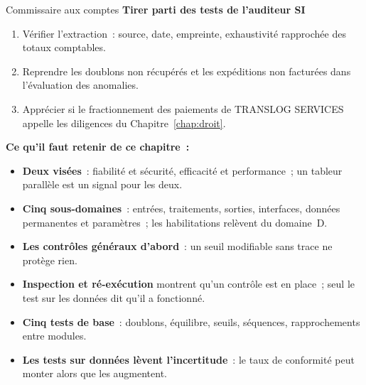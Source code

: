 \begin{boxmetier}{Commissaire aux comptes}
\textbf{Tirer parti des tests de l'auditeur SI}
\begin{enumerate}
    \item Vérifier l'extraction~: source, date, empreinte, exhaustivité
          rapprochée des totaux comptables.
    \item Reprendre les doublons non récupérés et les expéditions non
          facturées dans l'évaluation des anomalies.
    \item Apprécier si le fractionnement des paiements de TRANSLOG SERVICES
          appelle les diligences du Chapitre~\ref{chap:droit}.
\end{enumerate}
\end{boxmetier}


\separateur

\begin{boxresume}
\textbf{Ce qu'il faut retenir de ce chapitre~:}
\begin{itemize}
    \item \textbf{Deux visées}~: fiabilité et sécurité, efficacité et
          performance~; un tableur parallèle est un signal pour les deux.
    \item \textbf{Cinq sous-domaines}~: entrées, traitements, sorties,
          interfaces, données permanentes et paramètres~; les habilitations
          relèvent du domaine~D.
    \item \textbf{Les contrôles généraux d'abord}~: un seuil modifiable sans
          trace ne protège rien.
    \item \textbf{Inspection et ré-exécution} montrent qu'un contrôle est en
          place~; seul le test sur les données dit qu'il a fonctionné.
    \item \textbf{Cinq tests de base}~: doublons, équilibre, seuils,
          séquences, rapprochements entre modules.
    \item \textbf{Les tests sur données lèvent l'incertitude}~: le taux de
          conformité peut monter alors que les \NON{} augmentent.
\end{itemize}
\end{boxresume}

\bigskip

